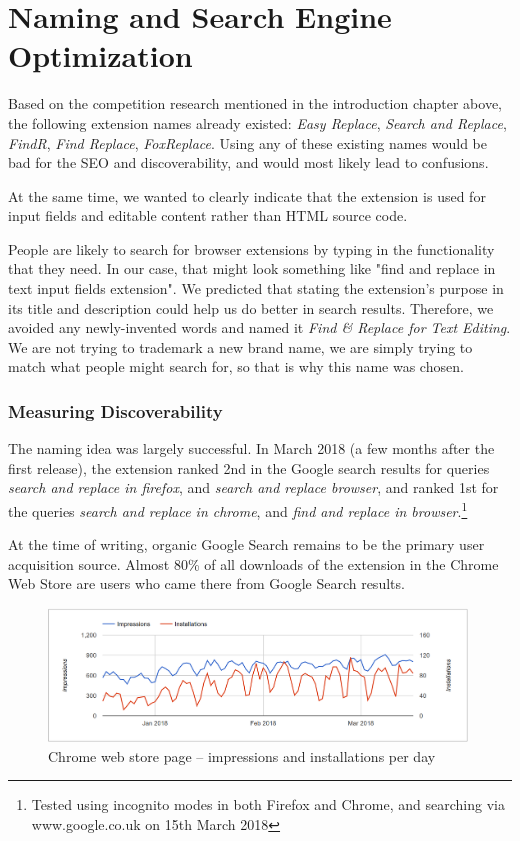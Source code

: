 \documentclass[bsc,frontabs,twoside,singlespacing,parskip,deptreport]{infthesis}
\begin{document}
\section{Naming and Search Engine Optimization}
Based on the competition research mentioned in the introduction chapter above, the following extension names already existed: \textit{Easy Replace}, \textit{Search and Replace}, \textit{FindR}, \textit{Find Replace}, \textit{FoxReplace}. Using any of these existing names would be bad for the SEO and discoverability, and would most likely lead to confusions.

At the same time, we wanted to clearly indicate that the extension is used for input fields and editable content rather than HTML source code.

People are likely to search for browser extensions by typing in the functionality that they need. In our case, that might look something like "find and replace in text input fields extension". We predicted that stating the extension's purpose in its title and description could help us do better in search results. Therefore, we avoided any newly-invented words and named it \textit{Find \& Replace for Text Editing}. We are not trying to trademark a new brand name, we are simply trying to match what people might search for, so that is why this name was chosen.

\subsubsection*{Measuring Discoverability}
The naming idea was largely successful. In March 2018 (a few months after the first release), the extension ranked 2nd in the Google search results for queries \textit{search and replace in firefox}, and \textit{search and replace browser}, and ranked 1st for the queries \textit{search and replace in chrome}, and \textit{find and replace in browser}.\footnote{Tested using incognito modes in both Firefox and Chrome, and searching via www.google.co.uk on 15th March 2018}

At the time of writing, organic Google Search remains to be the primary user acquisition source. Almost 80\% of all downloads of the extension in the Chrome Web Store are users who came there from Google Search results. 

\begin{figure}[h]
\centering
\includegraphics[width=0.99\textwidth]{../docs/chrome-impressions.png}
\caption{Chrome web store page -- impressions and installations per day}
\end{figure}
\end{document}
